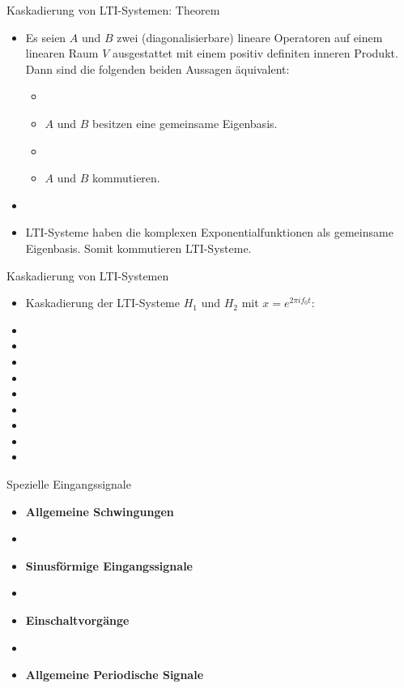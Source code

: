 \documentclass[14pt, aspectratio=169, handout]{beamer}
\begin{document}
\begin{frame}{Kaskadierung von LTI-Systemen: Theorem}
    \begin{itemize}
        \item Es seien $A$ und $B$ zwei (diagonalisierbare) lineare Operatoren auf einem linearen Raum $V$ ausgestattet mit einem positiv definiten inneren Produkt. Dann sind die folgenden beiden Aussagen äquivalent: \begin{itemize}
        \item[]
        \item[(i)] $A$ und $B$ besitzen eine gemeinsame Eigenbasis.
        \item[] 
        \item[(ii)] $A$ und $B$ kommutieren.
    \end{itemize}
    \item[] 
    \item LTI-Systeme haben die komplexen Exponentialfunktionen als gemeinsame Eigenbasis. Somit kommutieren LTI-Systeme.
    \end{itemize}
\end{frame}

\begin{frame}{Kaskadierung von LTI-Systemen}
    \begin{itemize}
        \item Kaskadierung der LTI-Systeme $H_1$ und $H_2$ mit $x=e^{2 \pi i f_0 t}$:
        \item[] 
        \item[] 
        \item[] 
        \item[] 
        \item[] 
        \item[] 
        \item[] 
        \item[] 
        \item[] %
    \end{itemize}
\end{frame}

\begin{frame}{Spezielle Eingangssignale}
    \begin{itemize}
        \item \textbf{Allgemeine Schwingungen}
        \item[] 
        \item \textbf{Sinusförmige Eingangssignale}
        \item[] 
        \item \textbf{Einschaltvorgänge}
        \item[]
        \item \textbf{Allgemeine Periodische Signale}
    \end{itemize}
\end{frame}
\end{document}
